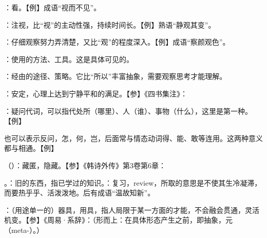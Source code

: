 {
\item {}：看。【例】成语“视而不见”。

：注视，比“视”的主动性强，持续时间长。【例】熟语“静观其变”。

：仔细观察努力弄清楚，又比“观”的程度深入。【例】成语“察颜观色”。
\item {}：使用的方法、工具。这是具体可见的。

：经由的途径、策略。它比“所以”丰富抽象，需要观察思考才能理解。%

：安定，心理上达到宁静平和的满足。【参】《四书集注》：

\item {}：疑问代词，可以指代处所（哪里）、人（谁）、事物（什么），这里是第一种。【例】  

也可以表示反问，怎，何，岂，后面常与情态动词得、能、敢等连用。这两种意义都与相通。【例】   %
\item {}（）：藏匿，隐藏。【参】《韩诗外传》第3卷第6章：
}
{}


{
\item {}。：旧的东西，指已学过的知识。：复习，review，所取的意思是不使其生冷凝滞，而要热乎乎、活泼泼地。后有成语“温故知新”。
}
{}  %


{
\item {}：（用途单一的）器具，用具，指人局限于某一方面的才能，不会融会贯通，灵活机变。【参】《周易·系辞》：（形而上：在具体形态产生之前，即抽象，元（meta-）。）
}
{}  %


